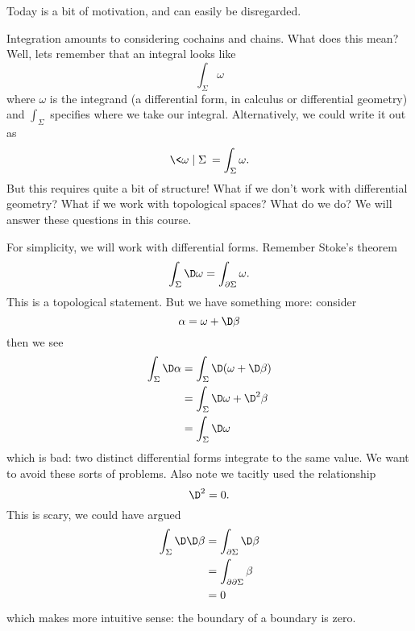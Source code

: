 Today is a bit of motivation, and can easily be disregarded.

Integration amounts to considering cochains and chains. What does
this mean? Well, lets remember that an integral looks like
\begin{equation}
\int_{\Sigma}\omega
\end{equation}
where $\omega$ is the integrand (a differential form, in calculus
or differential geometry) and $\int_{\Sigma}$ specifies where we
take our integral. Alternatively, we could write it out as
\begin{equation}
\<\omega\mid\Sigma\>=\int_{\Sigma}\omega.
\end{equation}
But this requires quite a bit of structure! What if we don't work
with differential geometry? What if we work with topological
spaces? What do we do? We will answer these questions in this course.

For simplicity, we will work with differential forms. Remember
Stoke's theorem
\begin{equation}
\int_{\Sigma}\D\omega=\int_{\partial\Sigma}\omega.
\end{equation}
This is a topological statement. But we have something more:
consider
\begin{equation}
\alpha=\omega+\D\beta
\end{equation}
then we see
\begin{equation}
\begin{split}
\int_{\Sigma}\D\alpha &= \int_{\Sigma}\D(\omega+\D\beta)\\
&= \int_{\Sigma}\D\omega+\D^{2}\beta\\
&= \int_{\Sigma}\D\omega
\end{split}
\end{equation}
which is bad: two distinct differential forms integrate to the
same value. We want to avoid these sorts of problems. Also note
we tacitly used the relationship
\begin{equation}
\D^2=0.
\end{equation}
This is scary, we could have argued
\begin{equation}
\begin{split}
\int_{\Sigma}\D\D\beta 
&=\int_{\partial\Sigma}\D\beta\\
&=\int_{\partial\partial\Sigma}\beta\\
&=0
\end{split}
\end{equation}
which makes more intuitive sense: the boundary of a boundary is
zero. 

